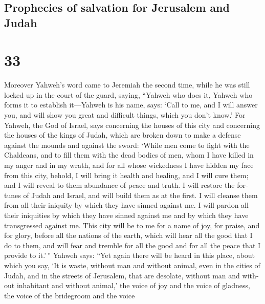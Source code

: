 \begin{paracol}{2}
\switchcolumn
\begin{otherlanguage}{english}

\hypertarget{prophecies-of-salvation-for-jerusalem-and-judah}{%
\subsection{Prophecies of salvation for Jerusalem and
Judah}\label{prophecies-of-salvation-for-jerusalem-and-judah}}

\hypertarget{section-65}{%
\section{33}\label{section-65}}

 Moreover Yahweh's word came to Jeremiah the second time,
while he was still locked up in the court of the guard, saying,
 ``Yahweh who does it, Yahweh who forms it to establish
it---Yahweh is his name, says:  `Call to me, and I will
answer you, and will show you great and difficult things, which you
don't know.'  For Yahweh, the God of Israel, says
concerning the houses of this city and concerning the houses of the
kings of Judah, which are broken down to make a defense against the
mounds and against the sword:  `While men come to fight
with the Chaldeans, and to fill them with the dead bodies of men, whom I
have killed in my anger and in my wrath, and for all whose wickedness I
have hidden my face from this city,  behold, I will bring
it health and healing, and I will cure them; and I will reveal to them
abundance of peace and truth.  I will restore the fortunes
of Judah and Israel, and will build them as at the first. 
I will cleanse them from all their iniquity by which they have sinned
against me. I will pardon all their iniquities by which they have sinned
against me and by which they have transgressed against me.
 This city will be to me for a name of joy, for praise,
and for glory, before all the nations of the earth, which will hear all
the good that I do to them, and will fear and tremble for all the good
and for all the peace that I provide to it.'\,''  Yahweh
says: ``Yet again there will be heard in this place, about which you
say, `It is waste, without man and without animal, even in the cities of
Judah, and in the streets of Jerusalem, that are desolate, without man
and without inhabitant and without animal,'  the voice of
joy and the voice of gladness, the voice of the bridegroom and the voice

\end{otherlanguage}
\end{paracol}
